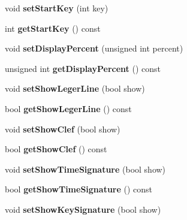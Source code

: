 \begin{DoxyCompactItemize}
void {\bfseries set\+Start\+Key} (int key)
\item 
\mbox{\label{class_o_v_e_1_1_track_a6c41141b0137a8d48ba534b1160d9a2c}} 
int {\bfseries get\+Start\+Key} () const
\item 
\mbox{\label{class_o_v_e_1_1_track_a1c9a338db8f9a3453f6116a4e14841d5}} 
void {\bfseries set\+Display\+Percent} (unsigned int percent)
\item 
\mbox{\label{class_o_v_e_1_1_track_af6cd0ca92c5b6caec7da42175d802d15}} 
unsigned int {\bfseries get\+Display\+Percent} () const
\item 
\mbox{\label{class_o_v_e_1_1_track_af2631a3f27c16c5d1c78cb2b826b6078}} 
void {\bfseries set\+Show\+Leger\+Line} (bool show)
\item 
\mbox{\label{class_o_v_e_1_1_track_a05a2f4a235fea8999412bd53a03a6659}} 
bool {\bfseries get\+Show\+Leger\+Line} () const
\item 
\mbox{\label{class_o_v_e_1_1_track_add29dc55a2e1f52f23786a5b8d805cbf}} 
void {\bfseries set\+Show\+Clef} (bool show)
\item 
\mbox{\label{class_o_v_e_1_1_track_a84ca457d6ab803bfd98220369fbac7d0}} 
bool {\bfseries get\+Show\+Clef} () const
\item 
\mbox{\label{class_o_v_e_1_1_track_af517c3c161d34edbdd8648f1b629bb54}} 
void {\bfseries set\+Show\+Time\+Signature} (bool show)
\item 
\mbox{\label{class_o_v_e_1_1_track_ad6dd6e7dde9f006c46023f354ec7b355}} 
bool {\bfseries get\+Show\+Time\+Signature} () const
\item 
\mbox{\label{class_o_v_e_1_1_track_a79c8cd2d3d076ce3cc6922a31b98b645}} 
void {\bfseries set\+Show\+Key\+Signature} (bool show)
\item 
\mbox{\label{class_o_v_e_1_1_track_a7b9803788ba7a45319fb0b0e9b237d76}} 

\end{DoxyCompactItemize}
